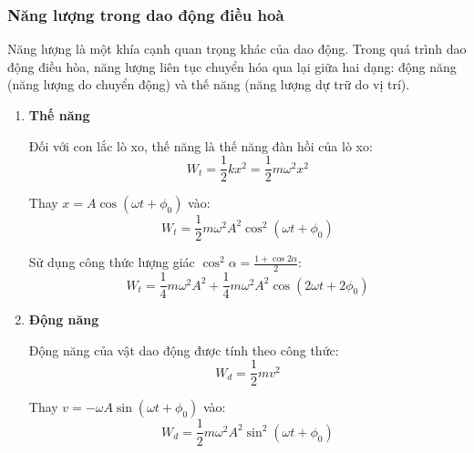 \subsubsection{Năng lượng trong dao động điều hoà}

Năng lượng là một khía cạnh quan trọng khác của dao động. Trong quá trình dao động điều hòa, năng lượng liên tục chuyển hóa qua lại giữa hai dạng: động năng (năng lượng do chuyển động) và thế năng (năng lượng dự trữ do vị trí).

\begin{enumerate}[label=\alph*)]
    \item \textbf{Thế năng}

    Đối với con lắc lò xo, thế năng là thế năng đàn hồi của lò xo:
    \[
        W_t = \frac{1}{2}kx^2 = \frac{1}{2}m\omega^2 x^2
    \]
    
    Thay $x = A\cos(\omega t + \phi_0)$ vào:
    \[
        W_t = \frac{1}{2}m\omega^2 A^2\cos^2(\omega t + \phi_0)
    \]

    Sử dụng công thức lượng giác $\cos^2\alpha = \frac{1 + \cos 2\alpha}{2}$:
    \[
        W_t = \frac{1}{4}m\omega^2 A^2 + \frac{1}{4}m\omega^2 A^2\cos(2\omega t + 2\phi_0)
    \]

    \begin{center}
    \end{center}

    \item \textbf{Động năng}

    Động năng của vật dao động được tính theo công thức:
    \[
        W_d = \frac{1}{2}mv^2
    \]
    
    Thay $v = -\omega A\sin(\omega t + \phi_0)$ vào:
    \[
        W_d = \frac{1}{2}m\omega^2 A^2\sin^2(\omega t + \phi_0)
    \]


\end{enumerate}
